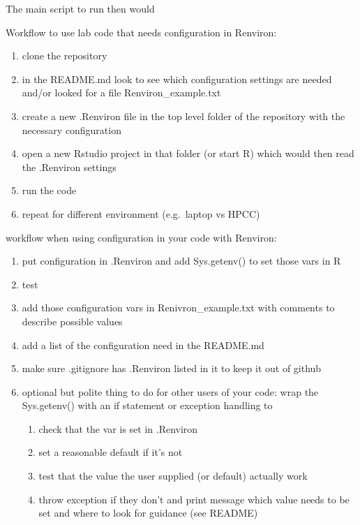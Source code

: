 \documentclass[
]{article}
\providecommand{\tightlist}{%
  \setlength{\itemsep}{0pt}\setlength{\parskip}{0pt}}
\begin{document}
The main script to run then would

Workflow to use lab code that needs configuration in Renviron:

\begin{enumerate}
\def\labelenumi{\arabic{enumi}.}
\tightlist
\item
  clone the repository
\item
  in the README.md look to see which configuration settings are needed
  and/or looked for a file Renviron\_example.txt
\item
  create a new .Renviron file in the top level folder of the repository with the necessary configuration
\item
  open a new Rstudio project in that folder (or start R) which would then read the .Renviron settings
\item
  run the code
\item
  repeat for different environment (e.g.~laptop vs HPCC)
\end{enumerate}

workflow when using configuration in your code with Renviron:

\begin{enumerate}
\def\labelenumi{\arabic{enumi}.}
\tightlist
\item
  put configuration in .Renviron and add Sys.getenv() to set those vars in R
\item
  test
\item
  add those configuration vars in Renivron\_example.txt with comments to describe possible values
\item
  add a list of the configuration need in the README.md
\item
  make sure .gitignore has .Renviron listed in it to keep it out of github
\item
  optional but polite thing to do for other users of your code: wrap the Sys.getenv() with an if statement or exception handling to

  \begin{enumerate}
  \def\labelenumii{\arabic{enumii})}
  \tightlist
  \item
    check that the var is set in .Renviron
  \item
    set a reasonable default if it's not
  \item
    test that the value the user supplied (or default) actually work
  \item
    throw exception if they don't and print message which value needs to be set and where to look for guidance (see README)
  \end{enumerate}
\end{enumerate}
\end{document}
